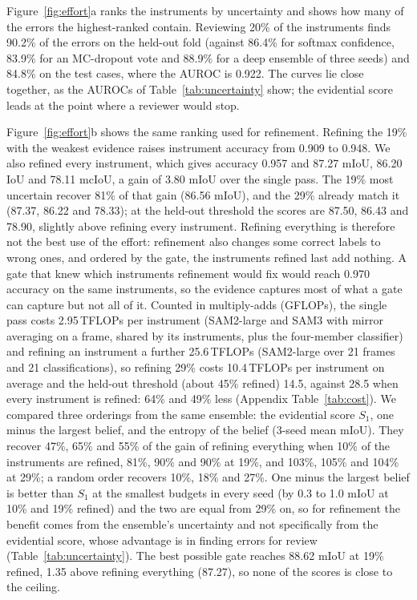 Figure~\ref{fig:effort}a ranks the instruments by uncertainty and shows how many of the errors the highest-ranked contain.
Reviewing 20\% of the instruments finds 90.2\% of the errors on the held-out fold (against 86.4\% for softmax confidence, 83.9\% for an MC-dropout vote and 88.9\% for a deep ensemble of three seeds) and 84.8\% on the test cases, where the AUROC is 0.922.
The curves lie close together, as the AUROCs of Table~\ref{tab:uncertainty} show; the evidential score leads at the point where a reviewer would stop.

Figure~\ref{fig:effort}b shows the same ranking used for refinement.
Refining the 19\% with the weakest evidence raises instrument accuracy from 0.909 to 0.948.
We also refined every instrument, which gives accuracy 0.957 and 87.27 mIoU, 86.20 IoU and 78.11 mcIoU, a gain of 3.80 mIoU over the single pass.
The 19\% most uncertain recover 81\% of that gain (86.56 mIoU), and the 29\% already match it (87.37, 86.22 and 78.33); at the held-out threshold the scores are 87.50, 86.43 and 78.90, slightly above refining every instrument.
Refining everything is therefore not the best use of the effort: refinement also changes some correct labels to wrong ones, and ordered by the gate, the instruments refined last add nothing.
A gate that knew which instruments refinement would fix would reach 0.970 accuracy on the same instruments, so the evidence captures most of what a gate can capture but not all of it.
Counted in multiply-adds (GFLOPs), the single pass costs 2.95\,TFLOPs per instrument (SAM2-large and SAM3 with mirror averaging on a frame, shared by its instruments, plus the four-member classifier) and refining an instrument a further 25.6\,TFLOPs (SAM2-large over 21 frames and 21 classifications), so refining 29\% costs 10.4\,TFLOPs per instrument on average and the held-out threshold (about 45\% refined) 14.5, against 28.5 when every instrument is refined: 64\% and 49\% less (Appendix Table~\ref{tab:cost}).
We compared three orderings from the same ensemble: the evidential score $S_1$, one minus the largest belief, and the entropy of the belief (3-seed mean mIoU).
They recover 47\%, 65\% and 55\% of the gain of refining everything when 10\% of the instruments are refined, 81\%, 90\% and 90\% at 19\%, and 103\%, 105\% and 104\% at 29\%; a random order recovers 10\%, 18\% and 27\%.
One minus the largest belief is better than $S_1$ at the smallest budgets in every seed (by 0.3 to 1.0 mIoU at 10\% and 19\% refined) and the two are equal from 29\% on, so for refinement the benefit comes from the ensemble's uncertainty and not specifically from the evidential score, whose advantage is in finding errors for review (Table~\ref{tab:uncertainty}).
The best possible gate reaches 88.62 mIoU at 19\% refined, 1.35 above refining everything (87.27), so none of the scores is close to the ceiling.

